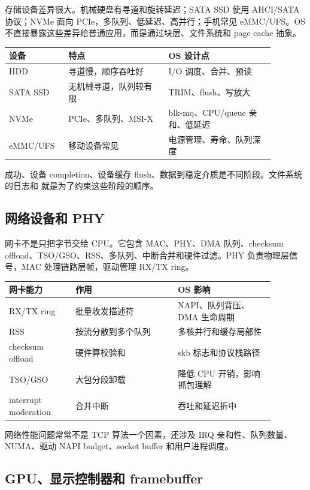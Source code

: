 存储设备差异很大。机械硬盘有寻道和旋转延迟；SATA SSD 使用 AHCI/SATA 协议；NVMe 面向 PCIe，多队列、低延迟、高并行；手机常见 eMMC/UFS。OS 不直接暴露这些差异给普通应用，而是通过块层、文件系统和 page cache 抽象。

\begin{longtable}{p{0.18\linewidth}p{0.34\linewidth}p{0.36\linewidth}}
\toprule
设备 & 特点 & OS 设计点 \\
\midrule
HDD & 寻道慢，顺序吞吐好 & I/O 调度、合并、预读 \\
SATA SSD & 无机械寻道，队列较有限 & TRIM、flush、写放大 \\
NVMe & PCIe、多队列、MSI-X & blk-mq、CPU/queue 亲和、低延迟 \\
eMMC/UFS & 移动设备常见 & 电源管理、寿命、队列深度 \\
\bottomrule
\end{longtable}

 成功、设备 completion、设备缓存 flush、数据到稳定介质是不同阶段。文件系统的日志和  就是为了约束这些阶段的顺序。

\subsection{网络设备和 PHY}

网卡不是只把字节交给 CPU。它包含 MAC、PHY、DMA 队列、checksum offload、TSO/GSO、RSS、多队列、中断合并和硬件过滤。PHY 负责物理层信号，MAC 处理链路层帧，驱动管理 RX/TX ring。

\begin{longtable}{p{0.22\linewidth}p{0.34\linewidth}p{0.32\linewidth}}
\toprule
网卡能力 & 作用 & OS 影响 \\
\midrule
RX/TX ring & 批量收发描述符 & NAPI、队列背压、DMA 生命周期 \\
RSS & 按流分散到多个队列 & 多核并行和缓存局部性 \\
checksum offload & 硬件算校验和 & skb 标志和协议栈路径 \\
TSO/GSO & 大包分段卸载 & 降低 CPU 开销，影响抓包理解 \\
interrupt moderation & 合并中断 & 吞吐和延迟折中 \\
\bottomrule
\end{longtable}

网络性能问题常常不是 TCP 算法一个因素，还涉及 IRQ 亲和性、队列数量、NUMA、驱动 NAPI budget、socket buffer 和用户进程调度。

\subsection{GPU、显示控制器和 framebuffer}

